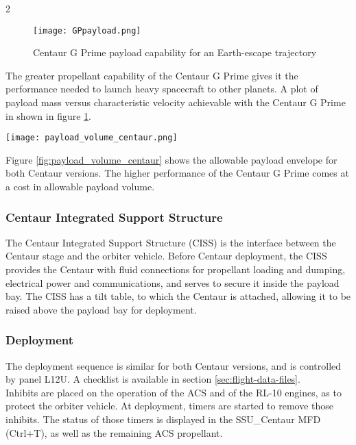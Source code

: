 \documentclass[Space_Shuttle_Ultra_Manual.tex]{subfiles}
\begin{document}
\begin{multicols*}{2}
\begin{figure}[H]
	\centering
	\captionsetup{justification=centering}
  \texttt{[image: GPpayload.png]}
  \caption{Centaur G Prime payload capability for an Earth-escape trajectory}
  \label{fig:GPpayload}
\end{figure}
\noindent
The greater propellant capability of the Centaur G Prime gives it the performance needed to launch heavy spacecraft to other planets. A plot of payload mass versus characteristic velocity achievable with the Centaur G Prime in shown in figure \ref{fig:GPpayload}.

\begin{figure*}[ht]
  \centering
  \texttt{[image: payload\_volume\_centaur.png]}
  \caption{Centaur G and G Prime payload envelope (dimensions in meters)}
  \label{fig:payload_volume_centaur}
\end{figure*}
\noindent
Figure \ref{fig:payload_volume_centaur} shows the allowable payload envelope for both Centaur versions. The higher performance of the Centaur G Prime comes at a cost in allowable payload volume.

\subsubsection{Centaur Integrated Support Structure}
The Centaur Integrated Support Structure (CISS) is the interface between the Centaur stage and the orbiter vehicle. Before Centaur deployment, the CISS provides the Centaur with fluid connections for propellant loading and dumping, electrical power and communications, and serves to secure it inside the payload bay. The CISS has a tilt table, to which the Centaur is attached, allowing it to be raised above the payload bay for deployment.

\subsubsection{Deployment}
The deployment sequence is similar for both Centaur versions, and is controlled by panel L12U. A checklist is available in section \ref{sec:flight-data-files}.
\\
Inhibits are placed on the operation of the ACS and of the RL-10 engines, as to protect the orbiter vehicle. At deployment, timers are started to remove those inhibits. The status of those timers is displayed in the SSU\_Centaur MFD (Ctrl+T), as well as the remaining ACS propellant.


\end{multicols*}
\end{document}
